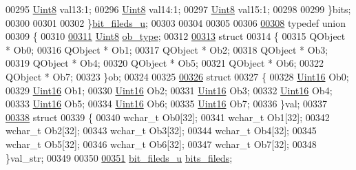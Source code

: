 \begin{DoxyCode}
00295         \hyperlink{a00001_a979e3e23b9a449e69ab6a8a83b6042f8}{Uint8} val13:1;
00296         \hyperlink{a00001_a979e3e23b9a449e69ab6a8a83b6042f8}{Uint8} val14:1;
00297         \hyperlink{a00001_a979e3e23b9a449e69ab6a8a83b6042f8}{Uint8} val15:1;
00298 
00299     \}bits;
00300 
00301 
00302 \}\hyperlink{a00001_d9/d2e/a00056}{bit\_fileds\_u};
00303 
00304 
00305 
00306 
\hypertarget{a00001_source_l00308}{}\hyperlink{a00001}{00308} \textcolor{keyword}{typedef} \textcolor{keyword}{union}
00309 \{
00310 
\hypertarget{a00001_source_l00311}{}\hyperlink{a00001_a3fd4fa69deb9b5e8697df532f7929160}{00311}     \hyperlink{a00001_a979e3e23b9a449e69ab6a8a83b6042f8}{Uint8} \hyperlink{a00001_a3fd4fa69deb9b5e8697df532f7929160}{ob\_type};
00312 
\hypertarget{a00001_source_l00313}{}\hyperlink{a00001}{00313}     \textcolor{keyword}{struct}
00314       \{
00315           QObject * Ob0;
00316           QObject * Ob1;
00317           QObject * Ob2;
00318           QObject * Ob3;
00319           QObject * Ob4;
00320           QObject * Ob5;
00321           QObject * Ob6;
00322           QObject * Ob7;
00323       \}ob;
00324 
00325 
\hypertarget{a00001_source_l00326}{}\hyperlink{a00001}{00326}     \textcolor{keyword}{struct}
00327     \{
00328         \hyperlink{a00001_aae7407b021d43f7193a81a58cfb3e297}{Uint16}  Ob0;
00329         \hyperlink{a00001_aae7407b021d43f7193a81a58cfb3e297}{Uint16}  Ob1;
00330         \hyperlink{a00001_aae7407b021d43f7193a81a58cfb3e297}{Uint16}  Ob2;
00331         \hyperlink{a00001_aae7407b021d43f7193a81a58cfb3e297}{Uint16}  Ob3;
00332         \hyperlink{a00001_aae7407b021d43f7193a81a58cfb3e297}{Uint16}  Ob4;
00333         \hyperlink{a00001_aae7407b021d43f7193a81a58cfb3e297}{Uint16}  Ob5;
00334         \hyperlink{a00001_aae7407b021d43f7193a81a58cfb3e297}{Uint16}  Ob6;
00335         \hyperlink{a00001_aae7407b021d43f7193a81a58cfb3e297}{Uint16}  Ob7;
00336     \}val;
00337 
\hypertarget{a00001_source_l00338}{}\hyperlink{a00001}{00338}     \textcolor{keyword}{struct}
00339     \{
00340         \textcolor{keywordtype}{wchar\_t}  Ob0[32];
00341         \textcolor{keywordtype}{wchar\_t}  Ob1[32];
00342         \textcolor{keywordtype}{wchar\_t}  Ob2[32];
00343         \textcolor{keywordtype}{wchar\_t}  Ob3[32];
00344         \textcolor{keywordtype}{wchar\_t}  Ob4[32];
00345         \textcolor{keywordtype}{wchar\_t}  Ob5[32];
00346         \textcolor{keywordtype}{wchar\_t}  Ob6[32];
00347         \textcolor{keywordtype}{wchar\_t}  Ob7[32];
00348     \}val\_str;
00349 
00350 
\hypertarget{a00001_source_l00351}{}\hyperlink{a00001_a37d24c00aef216555f2459d32bbcb21b}{00351}      \hyperlink{a00001_d9/d2e/a00056}{bit\_fileds\_u} \hyperlink{a00001_a37d24c00aef216555f2459d32bbcb21b}{bits\_fileds};

\end{DoxyCode}
